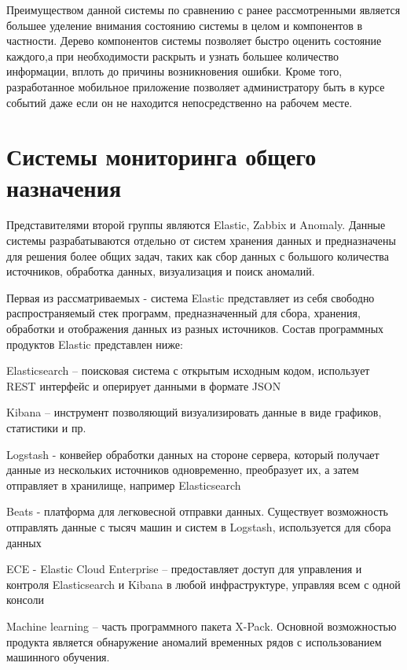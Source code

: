 Преимуществом данной системы по сравнению с ранее рассмотренными является большее уделение внимания состоянию системы в целом и компонентов в частности. Дерево компонентов системы позволяет быстро оценить состояние каждого,а при необходимости раскрыть и узнать большее количество информации, вплоть до причины возникновения ошибки. Кроме того, разработанное мобильное приложение позволяет администратору быть в курсе событий даже если он не находится непосредственно на рабочем месте. 
\section{Системы мониторинга общего назначения}
Представителями второй группы являются Elastic, Zabbix и Anomaly. Данные системы разрабатываются отдельно от систем хранения данных и предназначены для решения более общих задач, таких как сбор данных с большого количества источников, обработка данных, визуализация и поиск аномалий. 

Первая из рассматриваемых - система Elastic представляет из себя свободно распространяемый стек программ, предназначенный для сбора, хранения, обработки и отображения данных из разных источников. 
Состав программных продуктов Elastic представлен ниже: 
\begin{itemize*}
	\item{Elasticsearch – поисковая система с открытым исходным кодом, использует REST интерфейс и оперирует данными в формате JSON}
	\item{Kibana – инструмент позволяющий визуализировать данные в виде графиков, статистики и пр.}
	\item{Logstash - конвейер обработки данных на стороне сервера, который получает данные из нескольких источников одновременно, преобразует их, а затем отправляет в хранилище, например Elasticsearch}
	\item{Beats - платформа для легковесной отправки данных. Существует возможность отправлять данные с тысяч машин и систем в Logstash, используется для сбора данных}
	\item{ECE - Elastic Cloud Enterprise – предоставляет доступ для управления и контроля Elasticsearch и Kibana в любой инфраструктуре, управляя всем с одной консоли}
	\item{Machine learning – часть программного пакета X-Pack. Основной возможностью продукта является обнаружение аномалий временных рядов с использованием машинного обучения.}
\end{itemize*}

